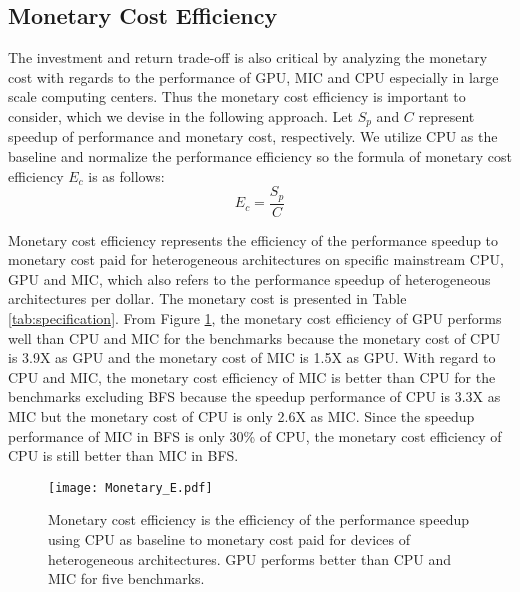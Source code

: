 \subsection{Monetary Cost Efficiency} 
The investment and return trade-off is also critical by analyzing the monetary cost with regards to 
the performance of GPU, MIC and CPU especially in large scale computing centers.
Thus the monetary cost efficiency is important to consider, which we devise in the following approach. 
Let $S_{p}$ and $C$ represent speedup of performance and monetary cost, respectively. We utilize CPU as the baseline and normalize the performance efficiency so the formula of monetary cost efficiency $E_{c}$ is as follows:
\begin{equation}\label{equ:monetaryE}
  {E_{c}} = \frac{S_{p}}{C}
\end{equation}

Monetary cost efficiency represents the efficiency of the performance speedup to monetary cost paid for heterogeneous architectures on specific mainstream CPU, GPU and MIC, which also refers to the performance speedup of heterogeneous architectures per dollar. The monetary cost is presented in Table \ref{tab:specification}. From Figure \ref{fig:monetaryE}, the monetary cost efficiency of GPU performs well than CPU and MIC for the benchmarks because the monetary cost of CPU is 3.9X as GPU and the monetary cost of MIC is 1.5X as GPU. With regard to CPU and MIC, the monetary cost efficiency of MIC is better than CPU for the benchmarks excluding BFS because the speedup performance of CPU is 3.3X as MIC but the monetary cost of CPU is only 2.6X as MIC. Since the speedup performance of MIC in BFS is only 30\% of CPU, the monetary cost efficiency of CPU is still better than MIC in BFS.

    \begin{figure}[h!]
  \centering
  \begin{minipage}{0.5\textwidth}
    \centering
   \centering
     \texttt{[image: Monetary\_E.pdf]}    
\caption{Monetary cost efficiency is the efficiency of the performance speedup using CPU as baseline to monetary cost paid for devices of heterogeneous architectures. GPU performs better than CPU and MIC for five benchmarks.}
\label{fig:monetaryE}
\end{minipage}%
\end{figure}


